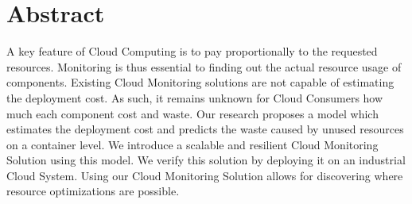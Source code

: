 \begingroup
\let\clearpage\relax
\let\cleardoublepage\relax
\let\cleardoublepage\relax

\chapter*{Abstract}
A key feature of Cloud Computing is to pay proportionally to the requested resources. Monitoring is thus essential to finding out the actual resource usage of components. Existing Cloud Monitoring solutions are not capable of estimating the deployment cost.
As such, it remains unknown for Cloud Consumers how much each component cost and waste.
Our research proposes a model which estimates the deployment cost and predicts the waste caused by unused resources on a container level. 
We introduce a scalable and resilient Cloud Monitoring Solution using this model. We verify this solution by deploying it on an industrial Cloud System.
Using our Cloud Monitoring Solution allows for discovering where resource optimizations are possible.
\vfill


\endgroup

\vfill
